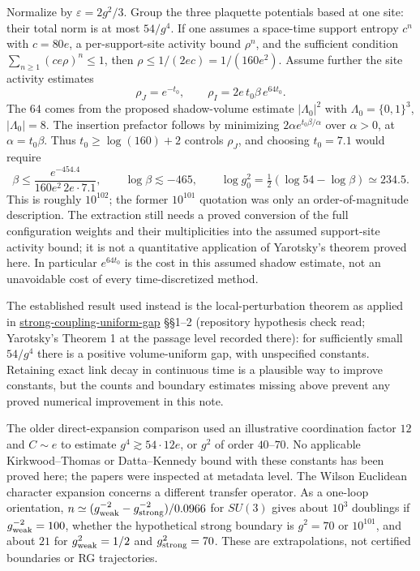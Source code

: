 \documentclass[11pt,a4paper]{article}
\begin{document}
Normalize by \(\varepsilon=2g^2/3\). Group the three plaquette
potentials based at one site: their total norm is at most \(54/g^4\). If
one assumes a space-time support entropy \(c^n\) with \(c=80e\), a
per-support-site activity bound \(\rho^n\), and the sufficient condition
\(\sum_{n\ge1}(ce\rho)^n\le1\), then \(\rho\le1/(2ec)=1/(160e^2)\).
Assume further the site activity estimates \[\rho_J=e^{-t_0},\qquad
\rho_I=2e\,t_0\beta\,e^{64t_0}.\] The \(64\) comes from the proposed
shadow-volume estimate \(|\Lambda_0|^2\) with \(\Lambda_0=\{0,1\}^3\),
\(|\Lambda_0|=8\). The insertion prefactor follows by minimizing
\(2\alpha e^{t_0\beta/\alpha}\) over \(\alpha>0\), at
\(\alpha=t_0\beta\). Thus \(t_0\ge\log(160)+2\) controls \(\rho_J\), and
choosing \(t_0=7.1\) would require
\[\beta\le\frac{e^{-454.4}}{160e^2\,2e\cdot7.1},\qquad
\log\beta\lesssim-465,\qquad
\log g_0^2=\tfrac12(\log54-\log\beta)\simeq234.5.\] This is roughly
\(10^{102}\); the former \(10^{101}\) quotation was only an
order-of-magnitude description. The extraction still needs a proved
conversion of the full configuration weights and their multiplicities
into the assumed support-site activity bound; it is not a quantitative
application of Yarotsky's theorem proved here. In particular
\(e^{64t_0}\) is the cost in this assumed shadow estimate, not an
unavoidable cost of every time-discretized method.

The established result used instead is the local-perturbation theorem as
applied in
\href{strong-coupling-uniform-gap.md}{strong-coupling-uniform-gap}
§§1--2 (repository hypothesis check read; Yarotsky's Theorem 1 at the
passage level recorded there): for sufficiently small \(54/g^4\) there
is a positive volume-uniform gap, with unspecified constants. Retaining
exact link decay in continuous time is a plausible way to improve
constants, but the counts and boundary estimates missing above prevent
any proved numerical improvement in this note.

The older direct-expansion comparison used an illustrative coordination
factor \(12\) and \(C\sim e\) to estimate \(g^4\gtrsim54\cdot12e\), or
\(g^2\) of order \(40\)--\(70\). No applicable Kirkwood--Thomas or
Datta--Kennedy bound with these constants has been proved here; the
papers were inspected at metadata level. The Wilson Euclidean character
expansion concerns a different transfer operator. As a one-loop
orientation, \(n\simeq(g_{\rm weak}^{-2}-g_{\rm strong}^{-2})/0.0966\)
for \(SU(3)\) gives about \(10^3\) doublings if
\(g_{\rm weak}^{-2}=100\), whether the hypothetical strong boundary is
\(g^2=70\) or \(10^{101}\), and about \(21\) for \(g_{\rm weak}^2=1/2\)
and \(g_{\rm strong}^2=70\). These are extrapolations, not certified
boundaries or RG trajectories.
\end{document}

